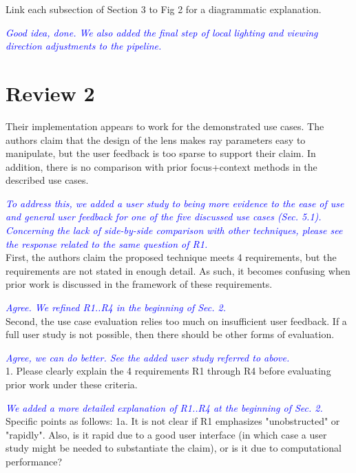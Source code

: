 \documentclass[a4paper,10pt]{article}
\newcommand{\rr}[1]{\emph{\textcolor{blue}{#1}}}
\begin{document}
    Link each subsection of Section 3 to Fig 2 for a diagrammatic explanation.
    
    \rr{Good idea, done. We also added the final step of local lighting and viewing direction adjustments to the pipeline.} 

\section{Review 2}

    Their implementation appears to work for the demonstrated use cases. The authors
    claim that the design of the lens makes ray parameters easy to manipulate, but the
    user feedback is too sparse to support their claim. In addition, there is no
    comparison with prior focus+context methods in the described use cases.
    
    \rr{To address this, we added a user study to being more evidence to the ease of use and general user feedback for one of the five discussed
    use cases (Sec. 5.1). Concerning the lack of side-by-side comparison with other techniques, please see the response related to the same question of R1.}\\

    First, the authors claim the proposed technique meets 4 requirements, but the requirements
    are not stated in enough detail. As such, it becomes confusing when prior work is
    discussed in the framework of these requirements. 
    
    \rr{Agree. We refined R1..R4 in the beginning of Sec. 2.}\\
    
    Second, the use case evaluation relies too much on insufficient user feedback. If a full user study is not
    possible, then there should be other forms of evaluation. 
    
    \rr{Agree, we can do better. See the added user study referred to above.}\\
    
    1. Please clearly explain the 4 requirements R1 through R4 before evaluating prior
    work under these criteria. 
    
    \rr{We added a more detailed explanation of R1..R4 at the beginning of Sec. 2.}\\
    
    Specific points as follows:
    1a. It is not clear if R1 emphasizes "unobstructed" or "rapidly". Also, is it
    rapid due to a good user interface (in which case a user study might be needed to
    substantiate the claim), or is it due to computational performance?
    
\end{document}
